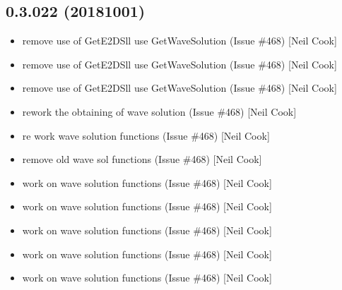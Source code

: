 \documentclass[a4paper,10pt,english]{report}
\begin{document}
\subsection{0.3.022 (2018\sphinxhyphen{}10\sphinxhyphen{}01)}
\label{\detokenize{misc/changelog:id328}}\begin{itemize}
\item {} 
 \sphinxhyphen{} remove use of GetE2DSll \sphinxhyphen{} use
GetWaveSolution (Issue \#468) {[}Neil Cook{]}

\item {} 
 \sphinxhyphen{} remove use of GetE2DSll \sphinxhyphen{} use GetWaveSolution (Issue
\#468) {[}Neil Cook{]}

\item {} 
 \sphinxhyphen{} remove use of GetE2DSll \sphinxhyphen{} use GetWaveSolution
(Issue \#468) {[}Neil Cook{]}

\item {} 
 \sphinxhyphen{} re\sphinxhyphen{}work the obtaining of wave solution (Issue \#468)
{[}Neil Cook{]}

\item {} 
 \sphinxhyphen{} re work wave solution functions (Issue \#468) {[}Neil
Cook{]}

\item {} 
 \sphinxhyphen{} remove old wave sol functions (Issue \#468)
{[}Neil Cook{]}

\item {} 
 \sphinxhyphen{} work on wave solution functions (Issue \#468)
{[}Neil Cook{]}

\item {} 
 \sphinxhyphen{} work on wave solution functions (Issue \#468) {[}Neil
Cook{]}

\item {} 
 \sphinxhyphen{} work on wave solution functions (Issue
\#468) {[}Neil Cook{]}

\item {} 
 \sphinxhyphen{} work on wave solution functions (Issue \#468)
{[}Neil Cook{]}

\item {} 
 \sphinxhyphen{} work on wave solution functions (Issue \#468)
{[}Neil Cook{]}


\end{itemize}
\end{document}
